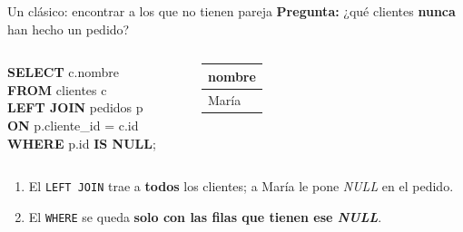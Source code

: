 \documentclass[aspectratio=169,10pt,c]{beamer}
\newcommand{\kw}[1]{\textcolor{utpRojo}{\textbf{#1}}}
\newcommand{\nuevo}[1]{{%
  \setlength{\fboxsep}{1.2pt}%
  \begingroup
  \renewcommand{\kw}[1]{\textcolor{utpNegro}{\textbf{##1}}}%
  \colorbox{yellow!45}{\textcolor{utpNegro}{#1}}%
  \endgroup}}
\newcommand{\nulo}{\textcolor{utpGrisMedio}{\textit{NULL}}}
\newenvironment{sqlcode}[1][.86\textwidth]
  {\begin{center}\begin{lrbox}{\sqlbuf}\begin{minipage}{#1}\ttfamily\footnotesize\vspace{6pt}\raggedright}
  {\vspace{6pt}\end{minipage}\end{lrbox}\colorbox{utpGrisClaro}{\usebox{\sqlbuf}}\end{center}}
\begin{document}
\begin{frame}{Un clásico: encontrar a los que no tienen pareja}
\small \textbf{Pregunta:} ¿qué clientes \textbf{nunca} han hecho un pedido?
\vspace{0.1cm}
\begin{columns}[c,onlytextwidth]
\begin{sqlcode}[\textwidth]
\scriptsize
\kw{SELECT} c.nombre\\
\kw{FROM} clientes c\\
\kw{LEFT JOIN} pedidos p \kw{ON} p.cliente\_id = c.id\\
\nuevo{\kw{WHERE} p.id \kw{IS NULL};}
\end{sqlcode}
\\[3pt]
\footnotesize\ttfamily
\begin{tabular}{l}
\toprule
\normalfont\bfseries nombre \\
\midrule
María \\
\bottomrule
\end{tabular}
\end{columns}
\vspace{0.2cm}
\begin{enumerate}\setlength\itemsep{6pt}
  \item El \texttt{LEFT JOIN} trae a \textbf{todos} los clientes; a María le pone \nulo{} en el pedido.
  \item El \texttt{WHERE} se queda \textbf{solo con las filas que tienen ese \nulo}.
\end{enumerate}
\vspace{0.3cm}
\end{frame}
\end{document}
